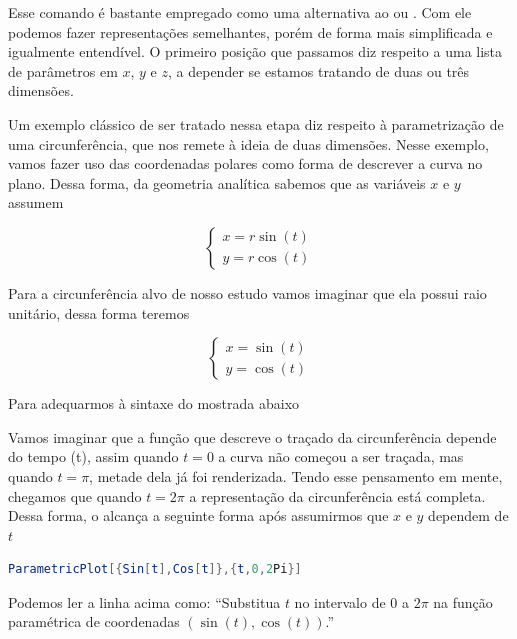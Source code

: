 \documentclass[a4paper, 12pt]{article}
\begin{document}
Esse comando é bastante empregado como uma alternativa ao  ou . Com ele podemos fazer representações semelhantes, porém de forma mais simplificada e igualmente entendível. O primeiro posição que passamos diz respeito a uma lista de parâmetros em $x$, $y$ e $z$, a depender se estamos tratando de duas ou três dimensões. 

Um exemplo clássico de ser tratado nessa etapa diz respeito à parametrização de uma circunferência, que nos remete à ideia de duas dimensões. Nesse exemplo, vamos fazer uso das coordenadas polares como forma de descrever a curva no plano. Dessa forma, da geometria analítica sabemos que as variáveis $x$ e $y$ assumem 

$$
\begin{cases}
	x=r\sin(t)\\
	y=r\cos(t)
\end{cases}
$$

Para a circunferência alvo de nosso estudo vamos imaginar que ela possui raio unitário, dessa forma teremos

$$
\begin{cases}
	x=\sin(t)\\
	y=\cos(t)
\end{cases}
$$

Para adequarmos à sintaxe do  mostrada abaixo

\begin{center}
\end{center}

Vamos imaginar que a função que descreve o traçado da circunferência depende do tempo (t), assim quando $t=0$ a curva não começou a ser traçada, mas quando $t=\pi$, metade dela já foi renderizada. Tendo esse pensamento em mente, chegamos que quando $t=2\pi$ a representação da circunferência está completa. Dessa forma, o  alcança a seguinte forma após assumirmos que $x$ e $y$ dependem de $t$

\begin{lstlisting}[language=Mathematica]
ParametricPlot[{Sin[t],Cos[t]},{t,0,2Pi}]
\end{lstlisting}

Podemos ler a linha acima como: ``Substitua $t$ no intervalo de 0 a $2\pi$ na função paramétrica de coordenadas $(\sin(t),\cos(t))$.''
\end{document}

